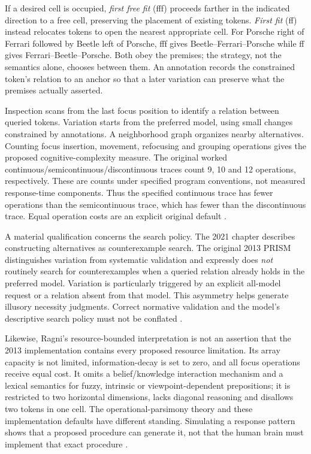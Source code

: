 If a desired cell is occupied, \emph{first free fit} (fff) proceeds farther
in the indicated direction to a free cell, preserving the placement of
existing tokens. \emph{First fit} (ff) instead relocates tokens to open the
nearest appropriate cell. For Porsche right of Ferrari followed by Beetle
left of Porsche, fff gives Beetle--Ferrari--Porsche while ff gives
Ferrari--Beetle--Porsche. Both obey the premises; the strategy, not the
semantics alone, chooses between them. An annotation records the constrained
token's relation to an anchor so that a later variation can preserve what
the premises actually asserted.

Inspection scans from the last focus position to identify a relation between
queried tokens. Variation starts from the preferred model, using small
changes constrained by annotations. A neighborhood graph organizes nearby
alternatives. Counting focus insertion, movement, refocusing and grouping
operations gives the proposed cognitive-complexity measure. The original
worked continuous/semicontinuous/discontinuous traces count 9, 10 and 12
operations, respectively. These are counts under specified program
conventions, not measured response-time components. Thus the specified
continuous trace has fewer operations than the semicontinuous trace,
which has fewer than the discontinuous trace. Equal operation costs are
an explicit original default
\cite[pp.~566--576,578,584]{RagniKnauff2013PRISM}.

A material qualification concerns the search policy. The 2021 chapter
describes constructing alternatives as counterexample search. The original
2013 PRISM distinguishes variation from systematic validation and expressly
does \emph{not} routinely search for counterexamples when a queried relation
already holds in the preferred model. Variation is particularly triggered
by an explicit all-model request or a relation absent from that model.
This asymmetry helps generate illusory necessity judgments. Correct
normative validation and the model's descriptive search policy must not be
conflated \cite[pp.~568--572,584]{RagniKnauff2013PRISM}.

Likewise, Ragni's resource-bounded interpretation is not an assertion that
the 2013 implementation contains every proposed resource limitation. Its
array capacity is not limited, information-decay is set to zero, and all
focus operations receive equal cost. It omits a belief/knowledge interaction
mechanism and a lexical semantics for fuzzy, intrinsic or viewpoint-dependent
prepositions; it is restricted to two horizontal dimensions, lacks diagonal
reasoning and disallows two tokens in one cell. The operational-parsimony
theory and these implementation defaults have different standing. Simulating
a response pattern shows that a proposed procedure can generate it, not
that the human brain must implement that exact procedure
\cite[pp.~582--585]{RagniKnauff2013PRISM}.

